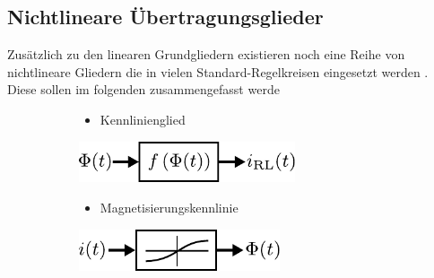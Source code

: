 \subsection{Nichtlineare Übertragungsglieder}
%
Zusätzlich zu den linearen Grundgliedern existieren noch eine Reihe von nichtlineare Gliedern die in vielen Standard-Regelkreisen eingesetzt werden \cite{Foellinger94,Landes00}. Diese sollen im folgenden zusammengefasst werde 
%
\begin{figure}[h]
	\begin{subfigure}[c]{\textwidth}
		\begin{minipage}{0.5\textwidth}
			\begin{itemize}
				\item Kennlinienglied
			\end{itemize}
		\end{minipage}\hfill
		\begin{minipage}{0.5\textwidth}
			\centering
			\includegraphics[width=0.7\textwidth]{Abbildungen/Modellbildung/PDF/Kennlinienglied.pdf}
		\end{minipage}
	\end{subfigure}
	\vspace{1cm}
	\begin{subfigure}[c]{\textwidth}
		\begin{minipage}{0.5\textwidth}
			\begin{itemize}
				\item Magnetisierungskennlinie
			\end{itemize}
		\end{minipage}\hfill
		\begin{minipage}{0.5\textwidth}
			\centering
			\includegraphics[width=0.65\textwidth]{Abbildungen/Modellbildung/PDF/Magnetisierungskurve.pdf}
		\end{minipage}
	\end{subfigure}
	\vspace{1cm}
	\begin{subfigure}[c]{\textwidth}

\end{subfigure}
\end{figure}
